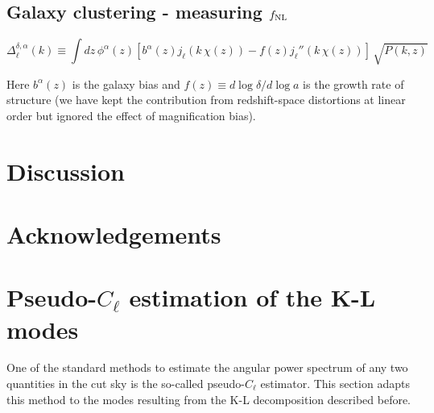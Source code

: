 \documentclass[twocolumn,amsfont,amssymb,amsmath, showpacs,balancelastpage, nofootinbib]{revtex4-1}
\begin{document}
  \subsection{Galaxy clustering - measuring $f_{\rm NL}$}\label{ssec:results.fnl}
    \begin{widetext}
    \begin{equation}
      \Delta^{\delta,\alpha}_\ell(k)\equiv\int dz\,\phi^\alpha(z)\left[b^\alpha(z)j_\ell(k\,\chi(z))-f(z)j_\ell''(k\,\chi(z))\right]\,\sqrt{P(k,z)}
    \end{equation}
    \end{widetext}
    Here $b^\alpha(z)$ is the galaxy bias and $f(z)\equiv d\log\delta/d\log a$ is the growth rate of structure (we have kept the contribution from redshift-space distortions at linear order but ignored the effect of magnification bias).

\section{Discussion}\label{sec:discussion}
  \lipsum[2]

\section*{Acknowledgements}
  \lipsum[3]
  


\appendix
\section{Pseudo-$C_\ell$ estimation of the K-L modes}\label{app:pcl}
  One of the standard methods to estimate the angular power spectrum of any two quantities in the cut sky is the so-called pseudo-$C_\ell$ estimator. This section adapts this method to the modes resulting from the K-L decomposition described before.
  
\end{document}
